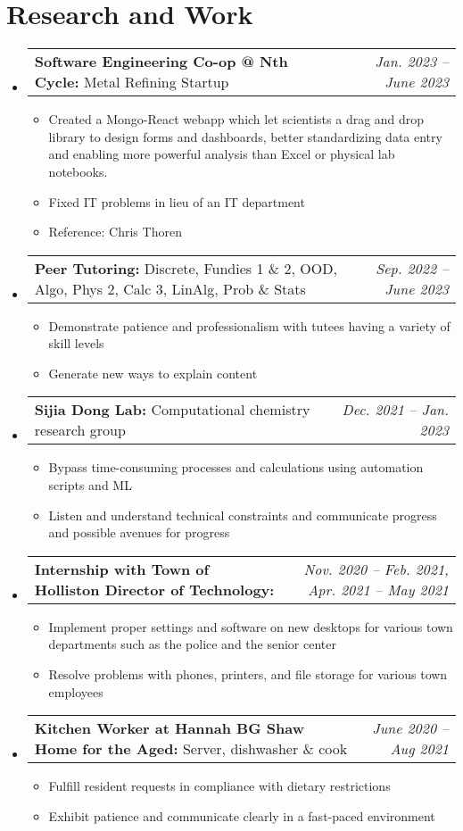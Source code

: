 \documentclass[letterpaper,11pt]{article}
\makeatletter
\newcommand{\resumeBullet}[1]{
  \item\small{
    #1 \vspace{-2pt}
  }
}
\newcommand{\resumeSubheadingThin}[3]{
  \vspace{-1pt}\item
    \begin{tabular*}{0.97\textwidth}[t]{l@{\extracolsep{\fill}}r}
      \small\textbf{#1:} #3 & \small\textit{#2} 
    \end{tabular*}\vspace{-5pt}
}
\newcommand{\resumeSubHeadingListStart}{\begin{itemize}[leftmargin=*]}
\newcommand{\resumeSubHeadingListEnd}{\end{itemize}}
\newcommand{\resumeItemListStart}{\begin{itemize}}
\newcommand{\resumeItemListEnd}{\end{itemize}\vspace{-5pt}}
\makeatother
\begin{document}
  \section{Research and Work}
  \resumeSubHeadingListStart
  \resumeSubheadingThin{Software Engineering Co-op @ Nth Cycle}{Jan. 2023 -- June 2023}{Metal Refining Startup}
  \resumeItemListStart
  \resumeBullet{Created a Mongo-React webapp which let scientists a drag and drop library to design forms and dashboards, better standardizing data entry and enabling more powerful analysis than Excel or physical lab notebooks. }
  \resumeBullet{Fixed IT problems in lieu of an IT department}
  \resumeBullet{Reference: Chris Thoren}
  \resumeItemListEnd
  \resumeSubheadingThin{Peer Tutoring}{Sep. 2022 -- June 2023}{Discrete, Fundies 1 \& 2, OOD, Algo, Phys 2, Calc 3, LinAlg, Prob \& Stats}
  \resumeItemListStart
    \resumeBullet{Demonstrate patience and professionalism with tutees having a variety of skill levels}
    \resumeBullet{Generate new ways to explain content}
  \resumeItemListEnd
  \resumeSubheadingThin{Sijia Dong Lab}{Dec. 2021 -- Jan. 2023}{Computational chemistry research group}
  \resumeItemListStart
    \resumeBullet{Bypass time-consuming processes and calculations using automation scripts and ML}
    \resumeBullet{Listen and understand technical constraints and communicate progress and possible avenues for progress}
  \resumeItemListEnd
  \resumeSubheadingThin{Internship with Town of Holliston Director of Technology}{Nov. 2020 -- Feb. 2021, Apr. 2021 -- May 2021}{}
  \resumeItemListStart
    \resumeBullet{Implement proper settings and software on new desktops for various town departments such as the police and the senior center}
    \resumeBullet{Resolve problems with phones, printers, and file storage for various town employees}
  \resumeItemListEnd
  \resumeSubheadingThin{Kitchen Worker at Hannah BG Shaw Home for the Aged}{June 2020 -- Aug 2021}{Server, dishwasher \& cook} \resumeItemListStart
  \resumeBullet{Fulfill resident requests in compliance with dietary restrictions}
  \resumeBullet{Exhibit patience and communicate clearly in a fast-paced environment}
  \resumeItemListEnd \resumeSubHeadingListEnd
\end{document}
